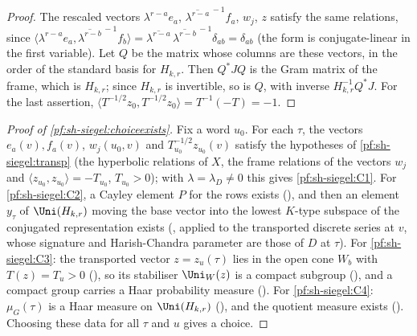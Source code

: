 \begin{proof}
The rescaled vectors $\lambda^{r-a}e_a$, $\overline{\lambda^{r-a}}^{\,-1}f_a$, $w_j$, $z$ satisfy the same relations, since
$\langle\lambda^{r-a}e_a,\overline{\lambda^{r-b}}^{\,-1}f_b\rangle=\overline{\lambda^{r-a}}\,\overline{\lambda^{r-b}}^{\,-1}
\delta_{ab}=\delta_{ab}$ (the form is conjugate-linear in the first variable). Let $Q$ be the matrix whose columns are
these vectors, in the order of the standard basis for $H_{k,r}$. Then $Q^*JQ$ is the Gram matrix of the frame, which is
$H_{k,r}$; since $H_{k,r}$ is invertible, so is $Q$, with inverse $H_{k,r}^{-1}Q^*J$. For the last assertion,
$\langle T^{-1/2}z_0,T^{-1/2}z_0\rangle=T^{-1}(-T)=-1$.
\end{proof}

\begin{proof}[Proof of \cref{pf:sh-siegel:choiceexists}]
Fix a word $u_0$. For each $\tau$, the vectors $e_a(v),f_a(v)$, $w_j(u_0,v)$ and $T_{u_0}^{-1/2}z_{u_0}(v)$ satisfy the
hypotheses of \cref{pf:sh-siegel:transp} (the hyperbolic relations of $X$, the frame relations of the vectors $w_j$ and
$\langle z_{u_0},z_{u_0}\rangle=-T_{u_0}$, $T_{u_0}>0$); with $\lambda=\lambda_D\ne0$ this gives \ref{pf:sh-siegel:C1}. For
\ref{pf:sh-siegel:C2}, a Cayley element $P$ for the rows exists (),
and then an element $y_\tau$ of $\Uni(H_{k,r})$ moving the base vector into the lowest $K$-type subspace of the conjugated
representation exists (, applied to the transported discrete series at $v$,
whose signature and Harish-Chandra parameter are those of $D$ at $\tau$). For \ref{pf:sh-siegel:C3}: the transported vector
$z=z_u(\tau)$ lies in the open cone $W_b$ with $T(z)=T_u>0$ (), so its
stabiliser $\Uni_W(z)$ is a compact subgroup (), and a compact
group carries a Haar probability measure (). For
\ref{pf:sh-siegel:C4}: $\mu_G(\tau)$ is a Haar measure on $\Uni(H_{k,r})$ (),
and the quotient measure exists (). Choosing these data for
all $\tau$ and $u$ gives a choice.
\end{proof}

